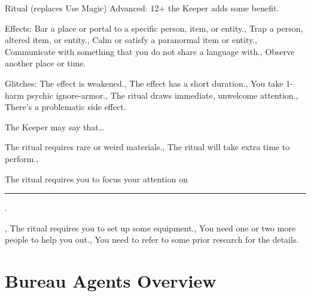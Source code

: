 \documentclass[12pt,oneside,landscape]{memoir}
\begin{document}
\begin{multicols}{4}
\begin{pbsect}{Ritual (replaces Use Magic)}
\brln
%
Advanced: 12+ the Keeper adds some benefit.
\end{pbsect}
%
\begin{blurb*}{Effects:}
\holdoptions%
    {{Bar a place or portal to a specific person, item, or entity.},
    {Trap a person, altered item, or entity.},
    {Calm or satisfy a paranormal item or entity.},
    {Communicate with something that you do not share a language with.},
    {Observe another place or time.}}
\end{blurb*}
%
\begin{blurb*}{Glitches:}
\holdoptions%
    {{The effect is weakened.},
    {The effect has a short duration.},
    {You take 1-harm psychic ignore-armor.},
    {The ritual draws immediate, unwelcome attention.},
    {There’s a problematic side effect.}}
\end{blurb*}

\begin{blurb*}{The Keeper may say that…}
\holdoptions%
    {{The ritual requires rare or weird materials.},
    {The ritual will take extra time to perform.},
    {The ritual requires you to focus your attention on \rule{0.3\linewidth}{0.4pt}.},
    {The ritual requires you to set up some equipment.},
    {You need one or two more people to help you out.},
    {You need to refer to some prior research for the details.}}
\end{blurb*}

\end{multicols}
\pagebreak

\chapter*{Bureau Agents Overview}
\end{document}
